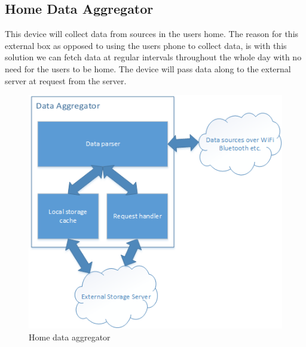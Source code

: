 \subsection{Home Data Aggregator}
This device will collect data from sources in the users home. The reason for this external box as opposed to using the users phone to collect data, is with this solution we can fetch data at regular intervals throughout the whole day with no need for the users to be home. The device will pass data along to the external server at request from the server.

\begin{figure}[H]
\includegraphics[width=\textwidth]{ch/projectPlan/fig/home.png}
\caption{Home data aggregator}
\end{figure}
